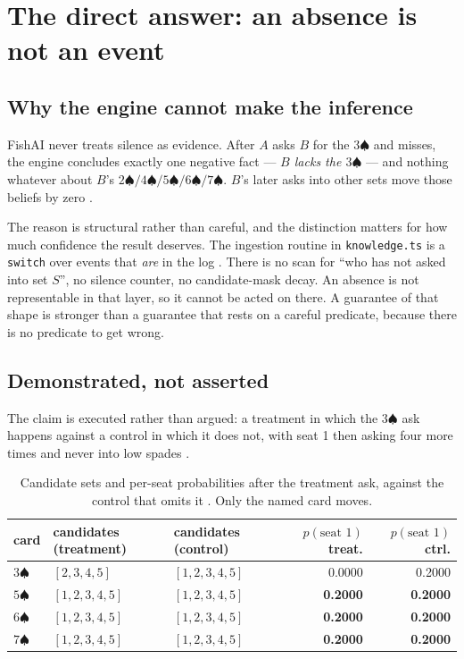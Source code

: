 \documentclass[11pt]{article}
\newcommand{\code}[1]{\texttt{#1}}
\begin{document}
\section{The direct answer: an absence is not an event}
\label{sec:absence}

\subsection{Why the engine cannot make the inference}

FishAI never treats silence as evidence. After $A$ asks $B$ for the $3\spadesuit$ and
misses, the engine concludes exactly one negative fact --- \emph{$B$ lacks the
$3\spadesuit$} --- and nothing whatever about $B$'s
$2\spadesuit/4\spadesuit/5\spadesuit/6\spadesuit/7\spadesuit$. $B$'s later asks into other
sets move those beliefs by zero \cite{asking}.

The reason is structural rather than careful, and the distinction matters for how much
confidence the result deserves. The ingestion routine in \code{knowledge.ts} is a
\code{switch} over events that \emph{are} in the log \cite{repo}. There is no scan for
``who has not asked into set $S$'', no silence counter, no candidate-mask decay. An
absence is not representable in that layer, so it cannot be acted on there. A guarantee of
that shape is stronger than a guarantee that rests on a careful predicate, because there
is no predicate to get wrong.

\subsection{Demonstrated, not asserted}
\label{sec:demo}

The claim is executed rather than argued: a treatment in which the $3\spadesuit$ ask
happens against a control in which it does not, with seat 1 then asking four more times
and never into low spades \cite{asking}.

\begin{table}[ht]
\centering
\caption{Candidate sets and per-seat probabilities after the treatment ask, against the
control that omits it \cite{asking}. Only the named card moves.}
\label{tab:demo}
\small
\begin{tabular}{@{}l l l r r@{}}
\toprule
card & candidates (treatment) & candidates (control) & $p(\text{seat }1)$ treat.
& $p(\text{seat }1)$ ctrl. \\
\midrule
$3\spadesuit$ & $[2,3,4,5]$   & $[1,2,3,4,5]$ & 0.0000 & 0.2000 \\
$5\spadesuit$ & $[1,2,3,4,5]$ & $[1,2,3,4,5]$ & \textbf{0.2000} & \textbf{0.2000} \\
$6\spadesuit$ & $[1,2,3,4,5]$ & $[1,2,3,4,5]$ & \textbf{0.2000} & \textbf{0.2000} \\
$7\spadesuit$ & $[1,2,3,4,5]$ & $[1,2,3,4,5]$ & \textbf{0.2000} & \textbf{0.2000} \\
\bottomrule
\end{tabular}
\end{table}
\end{document}
